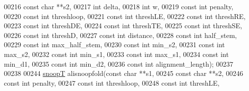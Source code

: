 \begin{DoxyCode}
00216                               \textcolor{keyword}{const} \textcolor{keywordtype}{char}  **s2,
00217                               \textcolor{keywordtype}{int}         delta,
00218                               \textcolor{keywordtype}{int}         w,
00219                               \textcolor{keyword}{const} \textcolor{keywordtype}{int}   penalty,
00220                               \textcolor{keyword}{const} \textcolor{keywordtype}{int}   threshloop,
00221                               \textcolor{keyword}{const} \textcolor{keywordtype}{int}   threshLE,
00222                               \textcolor{keyword}{const} \textcolor{keywordtype}{int}   threshRE,
00223                               \textcolor{keyword}{const} \textcolor{keywordtype}{int}   threshDE,
00224                               \textcolor{keyword}{const} \textcolor{keywordtype}{int}   threshTE,
00225                               \textcolor{keyword}{const} \textcolor{keywordtype}{int}   threshSE,
00226                               \textcolor{keyword}{const} \textcolor{keywordtype}{int}   threshD,
00227                               \textcolor{keyword}{const} \textcolor{keywordtype}{int}   distance,
00228                               \textcolor{keyword}{const} \textcolor{keywordtype}{int}   half\_stem,
00229                               \textcolor{keyword}{const} \textcolor{keywordtype}{int}   max\_half\_stem,
00230                               \textcolor{keyword}{const} \textcolor{keywordtype}{int}   min\_s2,
00231                               \textcolor{keyword}{const} \textcolor{keywordtype}{int}   max\_s2,
00232                               \textcolor{keyword}{const} \textcolor{keywordtype}{int}   min\_s1,
00233                               \textcolor{keyword}{const} \textcolor{keywordtype}{int}   max\_s1,
00234                               \textcolor{keyword}{const} \textcolor{keywordtype}{int}   min\_d1,
00235                               \textcolor{keyword}{const} \textcolor{keywordtype}{int}   min\_d2,
00236                               \textcolor{keyword}{const} \textcolor{keywordtype}{int}   alignment\_length);
00237 
00238 
00244 \hyperlink{group__data__structures_structsnoopT}{snoopT} alisnoopfold(\textcolor{keyword}{const} \textcolor{keywordtype}{char}  **s1,
00245                     \textcolor{keyword}{const} \textcolor{keywordtype}{char}  **s2,
00246                     \textcolor{keyword}{const} \textcolor{keywordtype}{int}   penalty,
00247                     \textcolor{keyword}{const} \textcolor{keywordtype}{int}   threshloop,
00248                     \textcolor{keyword}{const} \textcolor{keywordtype}{int}   threshLE,

\end{DoxyCode}
